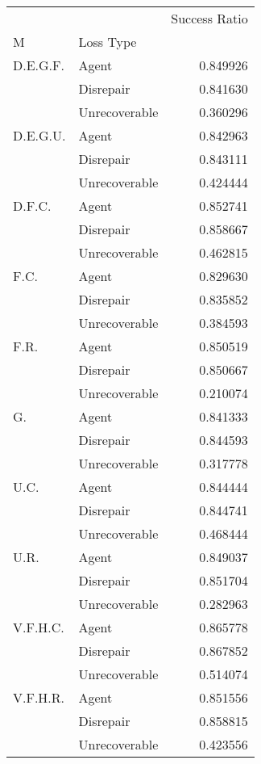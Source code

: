 \begin{tabular}{llr}
\toprule
         &               &  Success Ratio \\
M & Loss Type &                \\
\midrule
D.E.G.F. & Agent &       0.849926 \\
         & Disrepair &       0.841630 \\
         & Unrecoverable &       0.360296 \\
D.E.G.U. & Agent &       0.842963 \\
         & Disrepair &       0.843111 \\
         & Unrecoverable &       0.424444 \\
D.F.C. & Agent &       0.852741 \\
         & Disrepair &       0.858667 \\
         & Unrecoverable &       0.462815 \\
F.C. & Agent &       0.829630 \\
         & Disrepair &       0.835852 \\
         & Unrecoverable &       0.384593 \\
F.R. & Agent &       0.850519 \\
         & Disrepair &       0.850667 \\
         & Unrecoverable &       0.210074 \\
G. & Agent &       0.841333 \\
         & Disrepair &       0.844593 \\
         & Unrecoverable &       0.317778 \\
U.C. & Agent &       0.844444 \\
         & Disrepair &       0.844741 \\
         & Unrecoverable &       0.468444 \\
U.R. & Agent &       0.849037 \\
         & Disrepair &       0.851704 \\
         & Unrecoverable &       0.282963 \\
V.F.H.C. & Agent &       0.865778 \\
         & Disrepair &       0.867852 \\
         & Unrecoverable &       0.514074 \\
V.F.H.R. & Agent &       0.851556 \\
         & Disrepair &       0.858815 \\
         & Unrecoverable &       0.423556 \\
\bottomrule
\end{tabular}

